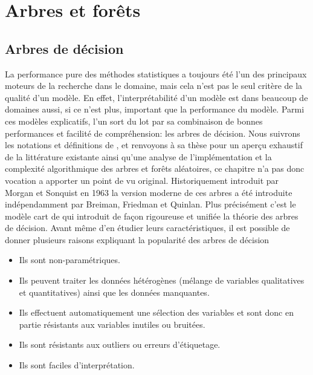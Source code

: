 
\chapter{Arbres et forêts}
\label{chap:quatre}

\section{Arbres de décision}


La performance pure des méthodes statistiques a toujours été l'un des principaux moteurs de la recherche dans le domaine, mais cela n'est pas le seul critère de la qualité d'un modèle. En effet, l'interprétabilité d'un modèle est dans beaucoup de domaines aussi, si ce n'est plus, important que la performance du modèle. Parmi ces modèles explicatifs, l'un sort du lot par sa combinaison de bonnes performances et facilité de compréhension: les arbres de décision. Nous suivrons les notations et définitions de \citet{Louppe2014}, et renvoyons à sa thèse pour un aperçu exhaustif de la littérature existante ainsi qu'une analyse de l'implémentation et la complexité algorithmique des arbres et forêts aléatoires, ce chapitre n'a pas donc vocation a apporter un point de vu original.
Historiquement introduit par Morgan et Sonquist en 1963 la version moderne de ces arbres a été introduite indépendamment par Breiman, Friedman et Quinlan. Plus précisément c'est le modèle \ac{cart} de \citet{Breiman1984a} qui introduit de façon rigoureuse et unifiée la théorie des arbres de décision.
Avant même d'en étudier leurs caractéristiques, il est possible de donner plusieurs raisons expliquant la popularité des arbres de décision
\begin{itemize}
    \item Ils sont non-paramétriques.
    \item Ils peuvent traiter les données hétérogènes (mélange de variables qualitatives et quantitatives) ainsi que les données manquantes.
    \item Ils effectuent automatiquement une sélection des variables et sont donc en partie résistants aux variables inutiles ou bruitées.
    \item Ils sont résistants aux outliers ou erreurs d'étiquetage.
    \item Ils sont faciles d'interprétation.
\end{itemize}

